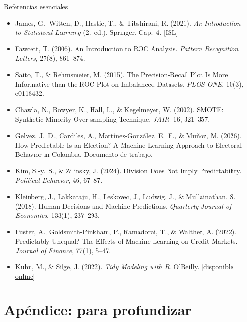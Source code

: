 \documentclass{beamer}
\newcommand{\1}{\mathbb{I}}
\begin{document}
\begin{frame}{Referencias esenciales}
\scriptsize
\begin{itemize}\itemsep2pt
  \item James, G., Witten, D., Hastie, T., \& Tibshirani, R. (2021). \emph{An Introduction to Statistical Learning} (2.\ ed.). Springer. Cap.\ 4. [ISL]
  \item Fawcett, T. (2006). An Introduction to ROC Analysis. \emph{Pattern Recognition Letters}, 27(8), 861--874.
  \item Saito, T., \& Rehmsmeier, M. (2015). The Precision-Recall Plot Is More Informative than the ROC Plot on Imbalanced Datasets. \emph{PLOS ONE}, 10(3), e0118432.
  \item Chawla, N., Bowyer, K., Hall, L., \& Kegelmeyer, W. (2002). SMOTE: Synthetic Minority Over-sampling Technique. \emph{JAIR}, 16, 321--357.
  \item Gelvez, J.\ D., Cardiles, A., Martínez-González, E.\ F., \& Muñoz, M. (2026). How Predictable Is an Election? A Machine-Learning Approach to Electoral Behavior in Colombia. Documento de trabajo.
  \item Kim, S.-y.\ S., \& Zilinsky, J. (2024). Division Does Not Imply Predictability. \emph{Political Behavior}, 46, 67--87.
  \item Kleinberg, J., Lakkaraju, H., Leskovec, J., Ludwig, J., \& Mullainathan, S. (2018). Human Decisions and Machine Predictions. \emph{Quarterly Journal of Economics}, 133(1), 237--293.
  \item Fuster, A., Goldsmith-Pinkham, P., Ramadorai, T., \& Walther, A. (2022). Predictably Unequal? The Effects of Machine Learning on Credit Markets. \emph{Journal of Finance}, 77(1), 5--47.
  \item Kuhn, M., \& Silge, J. (2022). \emph{Tidy Modeling with R}. O'Reilly. \href{https://www.tmwr.org}{[disponible online]}
\end{itemize}
\normalsize
\end{frame}


\appendix
\section{Apéndice: para profundizar}
\begin{frame}[noframenumbering]
\tableofcontents[currentsection]
\end{frame}
\end{document}
